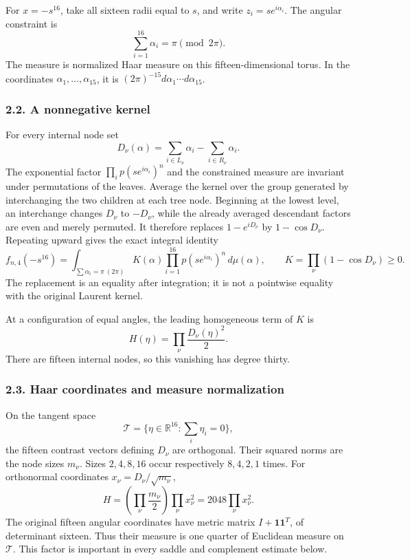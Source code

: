 \documentclass[
  11pt,
]{article}
\begin{document}
For \(x=-s^{16}\), take all sixteen radii equal to \(s\), and write
\(z_i=s e^{i\alpha_i}\). The angular constraint is \[
 \sum_{i=1}^{16}\alpha_i=\pi\pmod {2\pi}.
\] The measure is normalized Haar measure on this fifteen-dimensional
torus. In the coordinates \(\alpha_1,\ldots,\alpha_{15}\), it is
\((2\pi)^{-15}d\alpha_1\cdots d\alpha_{15}\).

\subsubsection{2.2. A nonnegative kernel}\label{a-nonnegative-kernel}

For every internal node set \[
 D_\nu(\alpha)=\sum_{i\in L_\nu}\alpha_i-
                    \sum_{i\in R_\nu}\alpha_i.
\] The exponential factor \(\prod_i p(s e^{i\alpha_i})^n\) and the
constrained measure are invariant under permutations of the leaves.
Average the kernel over the group generated by interchanging the two
children at each tree node. Beginning at the lowest level, an
interchange changes \(D_\nu\) to \(-D_\nu\), while the already averaged
descendant factors are even and merely permuted. It therefore replaces
\(1-e^{iD_\nu}\) by \(1-\cos D_\nu\). Repeating upward gives the exact
integral identity \[
 f_{n,4}(-s^{16})=
 \int_{\sum\alpha_i=\pi\ (2\pi)}
 K(\alpha)\prod_{i=1}^{16}p(s e^{i\alpha_i})^n\,d\mu(\alpha),
 \qquad K=\prod_\nu(1-\cos D_\nu)\ge0.                \tag{2.2}
\] The replacement is an equality after integration; it is not a
pointwise equality with the original Laurent kernel.

At a configuration of equal angles, the leading homogeneous term of
\(K\) is \[
 H(\eta)=\prod_\nu\frac{D_\nu(\eta)^2}{2}.           \tag{2.3}
\] There are fifteen internal nodes, so this vanishing has degree
thirty.

\subsubsection{2.3. Haar coordinates and measure
normalization}\label{haar-coordinates-and-measure-normalization}

On the tangent space \[
 \mathcal T=\{\eta\in\mathbb R^{16}:\sum_i\eta_i=0\},
\] the fifteen contrast vectors defining \(D_\nu\) are orthogonal. Their
squared norms are the node sizes \(m_\nu\). Sizes \(2,4,8,16\) occur
respectively \(8,4,2,1\) times. For orthonormal coordinates
\(x_\nu=D_\nu/\sqrt{m_\nu}\), \[
 H=\left(\prod_\nu\frac{m_\nu}{2}\right)\prod_\nu x_\nu^2
   =2048\prod_\nu x_\nu^2.                            \tag{2.4}
\] The original fifteen angular coordinates have metric matrix
\(I+\mathbf1\mathbf1^T\), of determinant sixteen. Thus their measure is
one quarter of Euclidean measure on \(\mathcal T\). This factor is
important in every saddle and complement estimate below.
\end{document}
